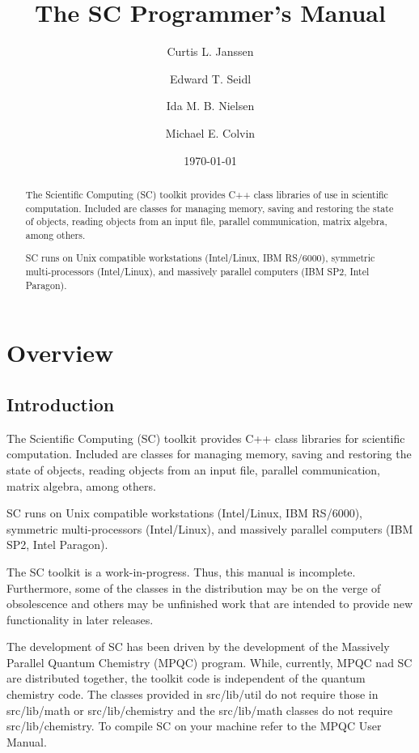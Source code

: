 \documentclass{report}
\begin{document}
\title{The SC Programmer's Manual}

\author{Curtis L. Janssen \and Edward T. Seidl \and Ida M. B. Nielsen
        \and Michael E. Colvin}

\date{\today}

\maketitle

\begin{abstract}

The Scientific Computing (SC) toolkit provides C++ class libraries of use
in scientific computation.  Included are classes for managing memory,
saving and restoring the state of objects, reading objects from an input
file, parallel communication, matrix algebra, among others.

SC runs on Unix compatible workstations (Intel/Linux,
IBM RS/6000), symmetric multi-processors (Intel/Linux),
and massively parallel computers (IBM SP2, Intel Paragon).

\end{abstract}

\tableofcontents

\part{Overview}

\chapter{Introduction}

The Scientific Computing (SC) toolkit provides C++ class libraries for
scientific computation.  Included are classes for managing memory, saving
and restoring the state of objects, reading objects from an input file,
parallel communication, matrix algebra, among others.

SC runs on Unix compatible workstations (Intel/Linux,
IBM RS/6000), symmetric multi-processors (Intel/Linux),
and massively parallel computers (IBM SP2, Intel Paragon).

The SC toolkit is a work-in-progress.  Thus, this manual is incomplete.
Furthermore, some of the classes in the distribution may be on the verge of
obsolescence and others may be unfinished work that are intended to provide
new functionality in later releases.

The development of SC has been driven by the development of the Massively
Parallel Quantum Chemistry (MPQC) program.  While, currently, MPQC nad SC
are distributed together, the toolkit code is independent of the quantum
chemistry code.  The classes provided in src/lib/util do not require those
in src/lib/math or src/lib/chemistry and the src/lib/math classes do not
require src/lib/chemistry.  To compile SC on your machine refer to the
MPQC User Manual.
\end{document}
